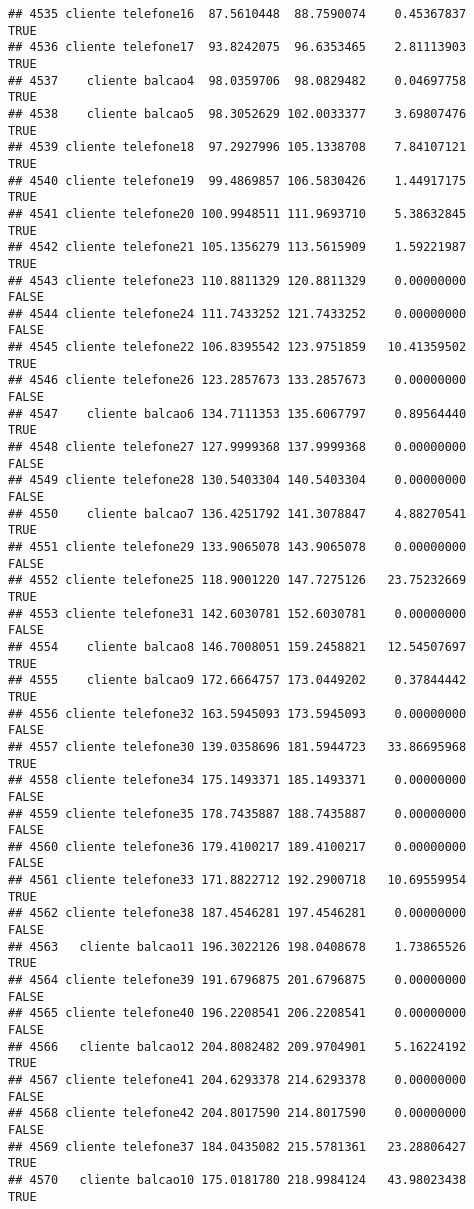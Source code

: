 \documentclass[
]{article}
\begin{document}
\begin{verbatim}
## 4535 cliente telefone16  87.5610448  88.7590074    0.45367837     TRUE
## 4536 cliente telefone17  93.8242075  96.6353465    2.81113903     TRUE
## 4537    cliente balcao4  98.0359706  98.0829482    0.04697758     TRUE
## 4538    cliente balcao5  98.3052629 102.0033377    3.69807476     TRUE
## 4539 cliente telefone18  97.2927996 105.1338708    7.84107121     TRUE
## 4540 cliente telefone19  99.4869857 106.5830426    1.44917175     TRUE
## 4541 cliente telefone20 100.9948511 111.9693710    5.38632845     TRUE
## 4542 cliente telefone21 105.1356279 113.5615909    1.59221987     TRUE
## 4543 cliente telefone23 110.8811329 120.8811329    0.00000000    FALSE
## 4544 cliente telefone24 111.7433252 121.7433252    0.00000000    FALSE
## 4545 cliente telefone22 106.8395542 123.9751859   10.41359502     TRUE
## 4546 cliente telefone26 123.2857673 133.2857673    0.00000000    FALSE
## 4547    cliente balcao6 134.7111353 135.6067797    0.89564440     TRUE
## 4548 cliente telefone27 127.9999368 137.9999368    0.00000000    FALSE
## 4549 cliente telefone28 130.5403304 140.5403304    0.00000000    FALSE
## 4550    cliente balcao7 136.4251792 141.3078847    4.88270541     TRUE
## 4551 cliente telefone29 133.9065078 143.9065078    0.00000000    FALSE
## 4552 cliente telefone25 118.9001220 147.7275126   23.75232669     TRUE
## 4553 cliente telefone31 142.6030781 152.6030781    0.00000000    FALSE
## 4554    cliente balcao8 146.7008051 159.2458821   12.54507697     TRUE
## 4555    cliente balcao9 172.6664757 173.0449202    0.37844442     TRUE
## 4556 cliente telefone32 163.5945093 173.5945093    0.00000000    FALSE
## 4557 cliente telefone30 139.0358696 181.5944723   33.86695968     TRUE
## 4558 cliente telefone34 175.1493371 185.1493371    0.00000000    FALSE
## 4559 cliente telefone35 178.7435887 188.7435887    0.00000000    FALSE
## 4560 cliente telefone36 179.4100217 189.4100217    0.00000000    FALSE
## 4561 cliente telefone33 171.8822712 192.2900718   10.69559954     TRUE
## 4562 cliente telefone38 187.4546281 197.4546281    0.00000000    FALSE
## 4563   cliente balcao11 196.3022126 198.0408678    1.73865526     TRUE
## 4564 cliente telefone39 191.6796875 201.6796875    0.00000000    FALSE
## 4565 cliente telefone40 196.2208541 206.2208541    0.00000000    FALSE
## 4566   cliente balcao12 204.8082482 209.9704901    5.16224192     TRUE
## 4567 cliente telefone41 204.6293378 214.6293378    0.00000000    FALSE
## 4568 cliente telefone42 204.8017590 214.8017590    0.00000000    FALSE
## 4569 cliente telefone37 184.0435082 215.5781361   23.28806427     TRUE
## 4570   cliente balcao10 175.0181780 218.9984124   43.98023438     TRUE

\end{verbatim}
\end{document}
